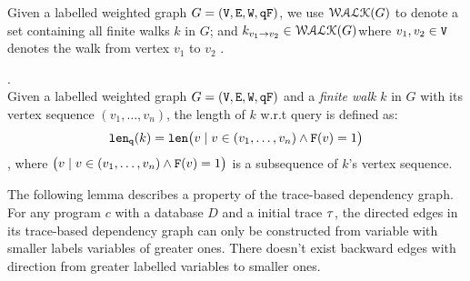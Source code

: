 %
Given a labelled weighted graph $G = (\mathtt{V}, \mathtt{E}, \mathtt{W}, \mathtt{qF})$, 
we use $\mathcal{WALK}(G)$ to denote a set containing all finite walks $k$ in $G$;
and $k_{v_1 \to v_2} \in \mathcal{WALK}(G)$where $v_1, v_2 \in \mathtt{V}$ denotes the walk from vertex $v_1$ to $v_2$ .
%
%
\begin{defn}.
\label{def:qlen}
\\
Given a labelled weighted graph $G = (\mathtt{V}, \mathtt{E}, \mathtt{W}, \mathtt{qF})$ and a \emph{finite walk} $k$ in $G$ with its vertex sequence $(v_1, \ldots, v_{n})$, the length of $k$ w.r.t query is defined as:
\[
  \mathtt{len}_{\tt q}(k) = \mathtt{len}\big(
  v \mid v \in (v_1, \ldots, v_{n}) \land \mathtt{F}(v) = 1 \big)
\]
, where $\big(v \mid v \in (v_1, \ldots, v_{n}) \land \mathtt{F}(v) = 1 \big)$ is a subsequence of $k$'s vertex sequence.
\end{defn}
%
%
% 
%
The following lemma describes a property of the trace-based dependency graph.
For any program $c$ with a database $D$ and a initial trace $\mathtt{\tau}$,
the directed edges in its trace-based dependency graph can only be constructed from variable with  
smaller labels variables of greater ones.
There doesn't exist backward edges with direction from greater labelled variables to smaller ones.
%
%
%